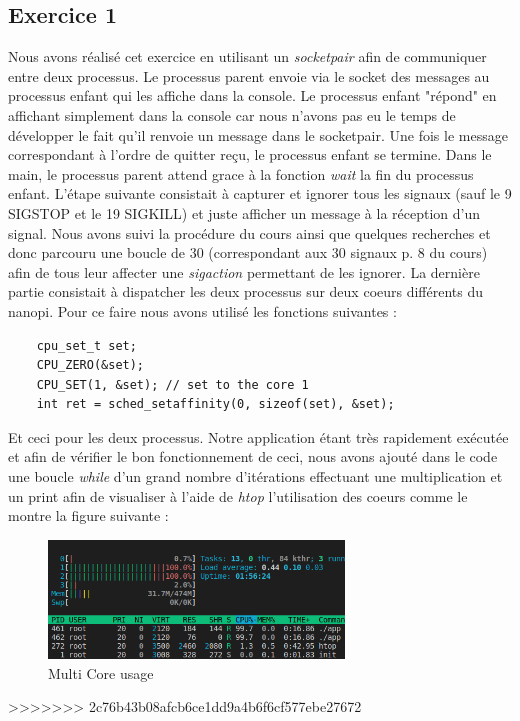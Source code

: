 \documentclass{ReportTemplate}
\begin{document}
\subsection{Exercice 1}
Nous avons réalisé cet exercice en utilisant un \textit{socketpair} afin de
communiquer entre deux processus. Le processus parent envoie via le socket des
messages au processus enfant qui les affiche dans la console. Le processus
enfant "répond" en affichant simplement dans la console car nous n'avons pas eu
le temps de développer le fait qu'il renvoie un message dans le socketpair. Une
fois le message correspondant à l'ordre de quitter reçu, le processus enfant se
termine. Dans le main, le processus parent attend grace à la fonction
\textit{wait} la fin du processus enfant.\newline
L'étape suivante consistait à capturer et ignorer tous les signaux (sauf le 9
SIGSTOP et le 19 SIGKILL) et juste afficher un message à la réception d'un
signal. Nous avons suivi la procédure du cours ainsi que quelques recherches et
donc parcouru une boucle de 30 (correspondant aux 30 signaux p. 8 du cours) afin
de tous leur affecter une \textit{sigaction} permettant de les ignorer.\newline
La dernière partie consistait à dispatcher les deux processus sur deux coeurs
différents du nanopi. Pour ce faire nous avons utilisé les fonctions suivantes :
\begin{verbatim}
    cpu_set_t set;
    CPU_ZERO(&set);
    CPU_SET(1, &set); // set to the core 1
    int ret = sched_setaffinity(0, sizeof(set), &set);
\end{verbatim}
Et ceci pour les deux processus. Notre application étant très rapidement
exécutée et afin de vérifier le bon fonctionnement de ceci, nous avons ajouté
dans le code une boucle \textit{while} d'un grand nombre d'itérations effectuant
une multiplication et un print afin de visualiser à l'aide de \textit{htop}
l'utilisation des coeurs comme le montre la figure suivante :
\begin{figure}[H]
    \centering
    \includegraphics[width=0.7\textwidth]{imageSources/MultiCPU.png.png}
    \caption{Multi Core usage}
    \label{fig:MultiCore}
\end{figure}
\newpage
>>>>>>> 2c76b43b08afcb6ce1dd9a4b6f6cf577ebe27672
\end{document}
